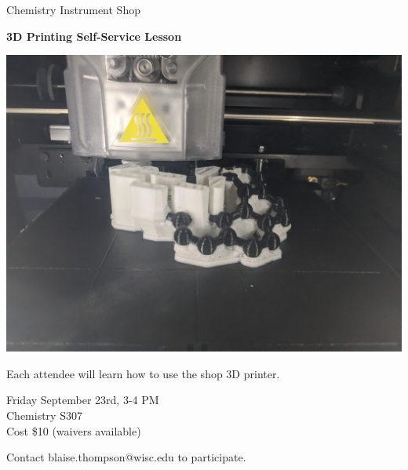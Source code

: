 \documentclass{article}
\begin{document}
\center

\Huge

Chemistry Instrument Shop

\textbf{
3D Printing
Self-Service Lesson
}

\includegraphics[width=\linewidth]{coverart.jpg}

{
\huge
Each attendee will learn how to use the shop 3D printer.
}

\vfill

{
\huge
Friday September 23rd, 3-4 PM \\
Chemistry S307 \\
Cost \$10 (waivers available) \\
}

\vfill

{
\huge
Contact blaise.thompson@wisc.edu to participate.
}
\end{document}
